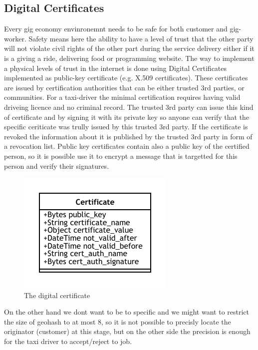 \documentclass{article}
\begin{document}
\subsection{Digital Certificates}

Every gig economy envinronemnt needs to be safe for both customer and gig-worker. Safety means here the ability to have a level of trust that the other party will not violate civil rights of the other part during the service delivery either if it is a giving a ride, delivering food or programming website. The way to implement a physical levels of trust in the internet is done using Digital Certificates implemented as public-key certificate (e.g. X.509 certificates). These certificates are issued by certification authorities that can be either trusted 3rd parties, or communities. For a taxi-driver the minimal certification requires having valid driveing licence and no criminal record. The trusted 3rd party can issue this kind of certificate and by signing it with its private key so anyone can verify that the specific ceriticate was trully issued by this trusted 3rd party. If the certificate is revoked the information about it is published by the trusted 3rd party in form of a revocation list. Public key certificates contain also a public key of the certified person, so it is possible use it to encrypt a message that is targetted for this person and verify their signatures.

\begin{figure}
	\centering
	\includegraphics[scale=1.0]{Certificate.pdf}
	\caption{The digital certificate}
	\label{fig:fr:certificate}
\end{figure}


On the other hand we dont want to be to specific and we might want to restrict the size of geohash to at most 8, so it is not possible to precisly locate the originator (customer) at this stage, but on the other side the precision is enough for the taxi driver to accept/reject to job.
\end{document}
